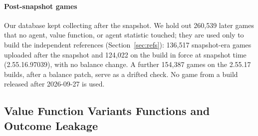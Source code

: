 \documentclass[journal]{IEEEtran}
\providecommand{\DIFaddtex}[1]{{\protect\color{blue} \sf #1}} %
\providecommand{\DIFdeltex}[1]{{\protect\color{red} \scriptsize #1}} %
\providecommand{\DIFaddbegin}{} %
\providecommand{\DIFaddend}{} %
\providecommand{\DIFdelbegin}{} %
\providecommand{\DIFdelend}{} %
\providecommand{\DIFadd}[1]{\texorpdfstring{\DIFaddtex{#1}}{#1}} %
\providecommand{\DIFdel}[1]{\texorpdfstring{\DIFdeltex{#1}}{}} %
\begin{document}
\DIFaddbegin \paragraph{\DIFadd{Post-snapshot games}} \DIFadd{Our database kept collecting after the snapshot. We hold out 260,539 later games that no agent, value function, or agent statistic touched; they are used only to build the independent references (Section~\ref{sec:refs}): 136,517 snapshot-era games uploaded after the snapshot and 124,022 on the build in force at snapshot time (2.55.16.97039), with no balance change. A further 154,387 games on the 2.55.17 builds, after a balance patch, serve as a drifted check. No game from a build released after 2026-09-27 is used.
}

\DIFaddend \subsection{Value \DIFdelbegin \DIFdel{Function Variants}\DIFdelend \DIFaddbegin \DIFadd{Functions and Outcome Leakage}\DIFaddend }
\DIFaddbegin \label{sec:leak}
\DIFaddend 
\end{document}
